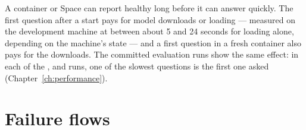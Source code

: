 \begin{inferred}
A container or Space can report healthy long before it can answer quickly. The first question after a start pays for model downloads or loading --- measured on the development machine at between about 5 and 24 seconds for loading alone, depending on the machine's state --- and a first question in a fresh container also pays for the downloads. The committed evaluation runs show the same effect: in each of the ,  and  runs, one of the slowest questions is the first one asked (Chapter~\ref{ch:performance}).
\end{inferred}

\section{Failure flows}
\label{sec:failure-flows}

